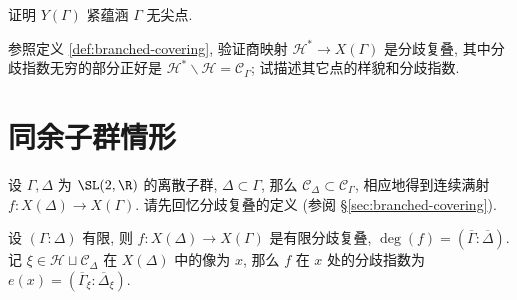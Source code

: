 \begin{exercise}
	证明 $Y(\Gamma)$ 紧蕴涵 $\Gamma$ 无尖点.
\end{exercise}

\begin{exercise}
	参照定义 \ref{def:branched-covering}, 验证商映射 $\mathcal{H}^* \to X(\Gamma)$ 是分歧复叠, 其中分歧指数无穷的部分正好是 $\mathcal{H}^* \smallsetminus \mathcal{H} = \mathcal{C}_\Gamma$; 试描述其它点的样貌和分歧指数.
\end{exercise}

\section{同余子群情形}\label{sec:cong-compactification}
设 $\Gamma, \Delta$ 为 $\SL(2,\R)$ 的离散子群, $\Delta \subset \Gamma$, 那么 $\mathcal{C}_\Delta \subset \mathcal{C}_\Gamma$, 相应地得到连续满射 $f: X(\Delta) \to X(\Gamma)$. 请先回忆分歧复叠的定义 (参阅 \S\ref{sec:branched-covering}).

\begin{proposition}\label{prop:commensurable-covering}
	设 $(\Gamma:\Delta)$ 有限, 则 $f: X(\Delta) \to X(\Gamma)$ 是有限分歧复叠, $\deg(f) = \left( \overline{\Gamma} : \overline{\Delta} \right)$. 记 $\xi \in \mathcal{H} \sqcup \mathcal{C}_\Delta$ 在 $X(\Delta)$ 中的像为 $x$, 那么 $f$ 在 $x$ 处的分歧指数为 $e(x) = \left( \overline{\Gamma}_\xi : \overline{\Delta}_\xi \right)$.
\end{proposition}

